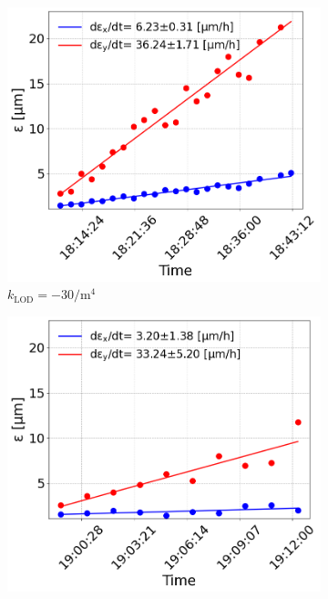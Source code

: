  \begin{figure}[htp]
    \centering
    \begin{subfigure}{.45\textwidth}
        \centering
        \includegraphics[width=.95\linewidth]{images/app_c/cc_md_12sep22_coast6.png}  
        \caption{$k_\mathrm{LOD}=-30 \mathrm{/m^{4}}$}
    \end{subfigure}
    \begin{subfigure}{.45\textwidth}
        \centering
        \includegraphics[width=.95\linewidth]{images/app_c/cc_md_12sep22_coast7.png}  

\end{subfigure}
\end{figure}
